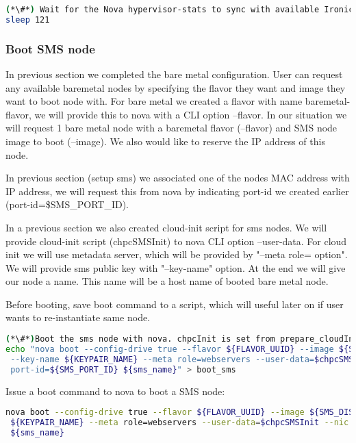 \begin{lstlisting}[language=bash,keywords={}]
(*\#*) Wait for the Nova hypervisor-stats to sync with available Ironic resources
sleep 121
\end{lstlisting}

\subsubsection{Boot SMS node}

In previous section we completed the bare metal configuration. User can request any available baremetal nodes by specifying the flavor they want and image they want to boot node with. For bare metal we created a flavor with name baremetal-flavor, we will provide this to nova with a CLI option --flavor. In our situation we will request 1 bare metal node with a baremetal flavor (--flavor) and SMS node image to boot (--image).  We also would like to reserve the IP address of this node. 

In previous section (setup sms) we associated one of the nodes MAC address with IP address, we will request this from nova by indicating port-id we created earlier (port-id=\${SMS\_PORT\_ID}). 

In a previous section we also created cloud-init script for sms nodes. We will provide cloud-init script (chpcSMSInit) to nova CLI option --user-data. For cloud init we will use metadata server, which will be provided by "--meta role= option". We will provide sms public key with "--key-name" option. At the end we will give our node a name. This name will be a host name of booted bare metal node.

Before booting, save boot command to a script, which will useful later on if user wants to re-instantiate same node.

\begin{lstlisting}[language=bash,keywords={}]
(*\#*)Boot the sms node with nova. chpcInit is set from prepare_cloudInit
echo "nova boot --config-drive true --flavor ${FLAVOR_UUID} --image ${SMS_DISK_IMAGE_UUID} \
 --key-name ${KEYPAIR_NAME} --meta role=webservers --user-data=$chpcSMSInit --nic \
 port-id=${SMS_PORT_ID} ${sms_name}" > boot_sms
\end{lstlisting}

Issue a boot command to nova to boot a SMS node:

\begin{lstlisting}[language=bash,keywords={}]
nova boot --config-drive true --flavor ${FLAVOR_UUID} --image ${SMS_DISK_IMAGE_UUID} --key-name
 ${KEYPAIR_NAME} --meta role=webservers --user-data=$chpcSMSInit --nic port-id=${SMS_PORT_ID} \
 ${sms_name}
\end{lstlisting}



